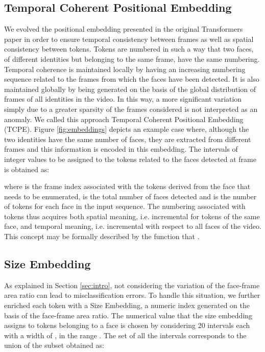 \documentclass[10pt,twocolumn,letterpaper]{article}
\begin{document}
\subsection{Temporal Coherent Positional Embedding}
We evolved the positional embedding presented in the original Transformers paper\cite{attentionisallyouneed} in order to ensure temporal consistency between frames as well as spatial consistency between tokens. Tokens are numbered in such a way that two faces, of different identities but belonging to the same frame, have the same numbering. Temporal coherence is maintained locally by having an increasing numbering sequence related to the frames from which the faces have been detected. It is also maintained globally by being generated on the basis of the global distribution of frames of all identities in the video. In this way, a more significant variation simply due to a greater sparsity of the frames considered is not interpreted as an anomaly. We called this approach Temporal Coherent Positional Embedding (TCPE).
Figure \ref{fig:embeddings} depicts an example case where, although the two identities have the same number of faces, they are extracted from different frames and this information is encoded in this embedding. The intervals of integer values  to be assigned to the tokens related to the faces detected at frame  is obtained as: 

where  is the frame index associated with the tokens derived from the face that needs to be enumerated,  is the total number of faces detected and  is the number of tokens for each face in the input sequence.
The numbering associated with tokens thus acquires both spatial meaning, i.e. incremental for tokens of the same face, and temporal meaning, i.e. incremental with respect to all faces of the video. This concept may be formally described by the function  that .

\subsection{Size Embedding}
As explained in Section \ref{sec:intro}, not considering the variation of the face-frame area ratio can lead to misclassification errors. To handle this situation, we further enriched each token with a Size Embedding, a numeric index generated on the basis of the face-frame area ratio. The numerical value that the size embedding assigns to tokens belonging to a face is chosen by considering 20 intervals each with a width of , in the range .
The set of all the intervals  corresponds to the union of the  subset obtained as:
\end{document}
